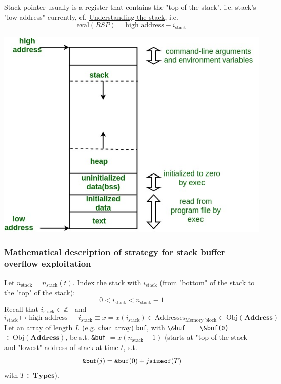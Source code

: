 \documentclass[10pt]{amsart}
\begin{document}
\begin{multicols*}{2}
Stack pointer usually is a register that contains the "top of the stack", i.e. stack's "low address" currently, cf. \href{https://www.cs.umd.edu/class/sum2003/cmsc311/Notes/Mips/stack.html}{Understanding the stack}, i.e. 
\begin{equation}
\text{eval}(RSP) = \text{high address} - i_{\text{stack}}
\end{equation}



	 	\includegraphics[totalheight=8cm]{images/Cmemory/memoryLayoutC.jpg}
	\begin{minipage}{.6\textwidth}
		\label{Fig:TypicalCMemoryLayout}
	\end{minipage}



\subsubsection{Mathematical description of strategy for stack buffer overflow exploitation}

Let $n_{\text{stack}} = n_{\text{stack}}(t)$.  Index the stack with $i_{\text{stack}}$ (from "bottom" of the stack to the "top" of the stack):
\[
0 < i_{\text{stack}} < n_{\text{stack}} - 1
\]
Recall that $i_{\text{stack}} \in \mathbb{Z}^+$ and 
\[
i_{\text{stack}} \mapsto \text{high address } - i_{\text{stack}} \equiv x = x(i_{\text{stack}}) \in \text{Addresses}_{\text{Memory block}} \subset \text{Obj}(\textbf{Address})
\]
Let an array of length $L$ (e.g. \verb|char| array) \verb|buf|, with \verb|\&buf| $=$ \verb|\&buf(0)| $\in  \text{Obj}{(\textbf{Address})}$, be s.t. \verb|&buf| $=x(n_{\text{stack}}-1)$ (starts at "top of the stack and "lowest" address of stack at time $t$, s.t. 
\[
\verb|&buf|(j) = \verb|&buf|(0) + j \verb|sizeof|(T)
\]
with $T\in \textbf{Types}$).  



\end{multicols*}
\end{document}
